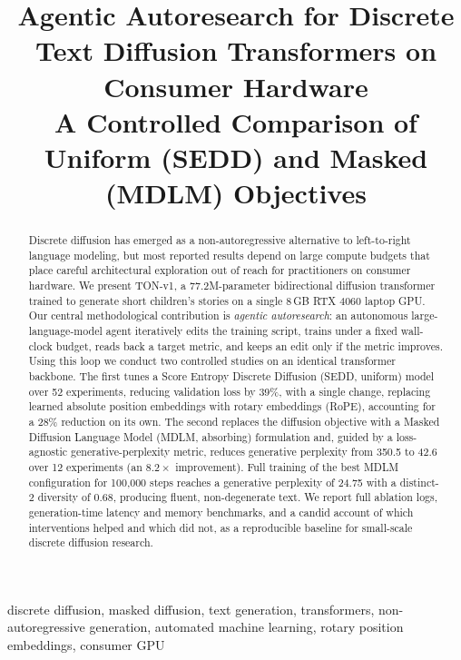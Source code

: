 \documentclass[conference]{IEEEtran}
\begin{document}
\title{Agentic Autoresearch for Discrete Text
Diffusion Transformers on Consumer Hardware\\
A Controlled Comparison of Uniform (SEDD) and Masked (MDLM) Objectives}

\author{
}

\maketitle

\begin{abstract}
Discrete diffusion has emerged as a non-autoregressive alternative to
left-to-right language modeling, but most reported results depend on
large compute budgets that place careful architectural exploration out
of reach for practitioners on consumer hardware. We present TON-v1, a
77.2M-parameter bidirectional diffusion transformer trained to generate
short children's stories on a single 8\,GB RTX 4060 laptop GPU. Our
central methodological contribution is \emph{agentic autoresearch}: an
autonomous large-language-model agent iteratively edits the training
script, trains under a fixed wall-clock budget, reads back a target
metric, and keeps an edit only if the metric improves. Using this loop
we conduct two controlled studies on an identical transformer backbone.
The first tunes a Score Entropy Discrete Diffusion (SEDD, uniform)
model over 52 experiments, reducing validation loss by 39\%, with a
single change, replacing learned absolute position embeddings with
rotary embeddings (RoPE), accounting for a 28\% reduction on its own.
The second replaces the diffusion objective with a Masked Diffusion
Language Model (MDLM, absorbing) formulation and, guided by a
loss-agnostic generative-perplexity metric, reduces generative
perplexity from 350.5 to 42.6 over 12 experiments (an
$8.2\times$ improvement). Full training of the best MDLM configuration
for 100{,}000 steps reaches a generative perplexity of 24.75 with a
distinct-2 diversity of 0.68, producing fluent, non-degenerate text.
We report full ablation logs, generation-time latency and memory
benchmarks, and a candid account of which interventions helped and
which did not, as a reproducible baseline for small-scale discrete
diffusion research.
\end{abstract}

\begin{IEEEkeywords}
discrete diffusion, masked diffusion, text generation, transformers,
non-autoregressive generation, automated machine learning, rotary
position embeddings, consumer GPU
\end{IEEEkeywords}
\end{document}
